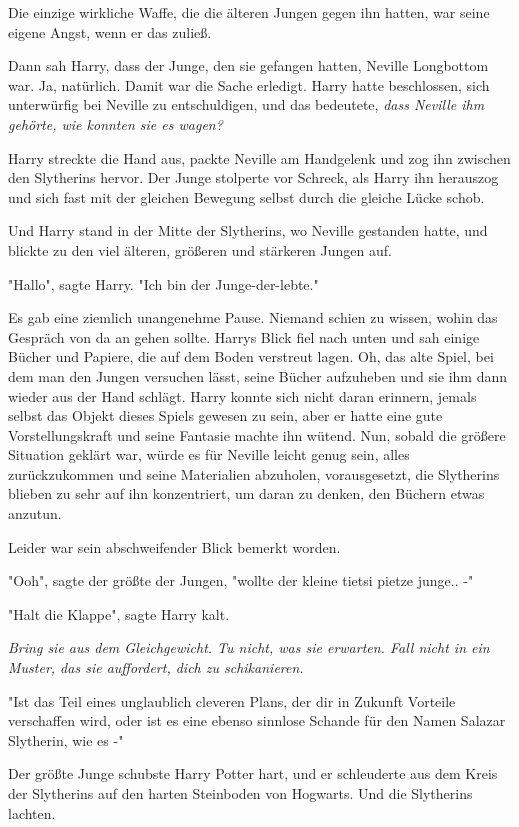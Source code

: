 {Die einzige wirkliche Waffe, die die älteren Jungen gegen ihn hatten, war seine eigene Angst, wenn er das zuließ.

Dann sah Harry, dass der Junge, den sie gefangen hatten, Neville Longbottom war. Ja, natürlich. Damit war die Sache erledigt. Harry hatte beschlossen, sich unterwürfig bei Neville zu entschuldigen, und das bedeutete, \emph{dass Neville ihm gehörte, wie konnten sie es wagen?}

Harry streckte die Hand aus, packte Neville am Handgelenk und zog ihn zwischen den Slytherins hervor. Der Junge stolperte vor Schreck, als Harry ihn herauszog und sich fast mit der gleichen Bewegung selbst durch die gleiche Lücke schob.

Und Harry stand in der Mitte der Slytherins, wo Neville gestanden hatte, und blickte zu den viel älteren, größeren und stärkeren Jungen auf.

"Hallo", sagte Harry. "Ich bin der Junge-der-lebte."

Es gab eine ziemlich unangenehme Pause. Niemand schien zu wissen, wohin das Gespräch von da an gehen sollte. Harrys Blick fiel nach unten und sah einige Bücher und Papiere, die auf dem Boden verstreut lagen. Oh, das alte Spiel, bei dem man den Jungen versuchen lässt, seine Bücher aufzuheben und sie ihm dann wieder aus der Hand schlägt. Harry konnte sich nicht daran erinnern, jemals selbst das Objekt dieses Spiels gewesen zu sein, aber er hatte eine gute Vorstellungskraft und seine Fantasie machte ihn wütend. Nun, sobald die größere Situation geklärt war, würde es für Neville leicht genug sein, alles zurückzukommen und seine Materialien abzuholen, vorausgesetzt, die Slytherins blieben zu sehr auf ihn konzentriert, um daran zu denken, den Büchern etwas anzutun.

Leider war sein abschweifender Blick bemerkt worden.

"Ooh", sagte der größte der Jungen, "wollte der kleine tietsi pietze junge.. -"

"Halt die Klappe", sagte Harry kalt.

\emph{Bring sie aus dem Gleichgewicht. Tu nicht, was sie erwarten. Fall nicht in ein Muster, das sie auffordert, dich zu schikanieren.}

"Ist das Teil eines unglaublich cleveren Plans, der dir in Zukunft Vorteile verschaffen wird, oder ist es eine ebenso sinnlose Schande für den Namen Salazar Slytherin, wie es -"

Der größte Junge schubste Harry Potter hart, und er schleuderte aus dem Kreis der Slytherins auf den harten Steinboden von Hogwarts. Und die Slytherins lachten.

}
